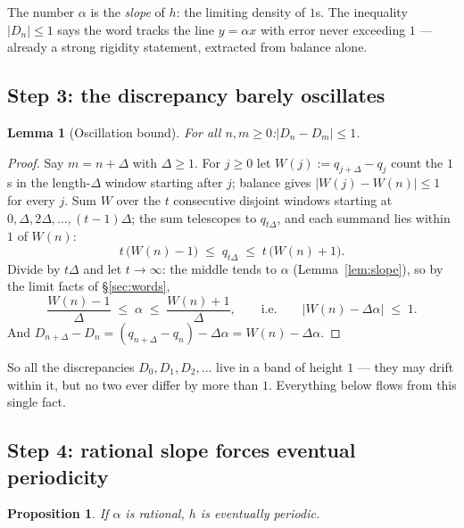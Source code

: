 \documentclass[11pt,reqno]{amsart}
\theoremstyle{plain}
\newtheorem{lemma}[theorem]{Lemma}
\newtheorem{proposition}[theorem]{Proposition}
\theoremstyle{definition}
\theoremstyle{remark}
\begin{document}
The number $\alpha$ is the \emph{slope} of $h$: the limiting density of $1$s. The
inequality $|D_n| \le 1$ says the word tracks the line $y = \alpha x$ with error
never exceeding $1$ --- already a strong rigidity statement, extracted from balance
alone.

\subsection{Step 3: the discrepancy barely oscillates}

\begin{lemma}[Oscillation bound]\label{lem:osc}
For all $n, m \ge 0$:\quad $|D_n - D_m| \le 1$.
\end{lemma}

\begin{proof}
Say $m = n + \Delta$ with $\Delta \ge 1$. For $j \ge 0$ let
$W(j) := q_{j + \Delta} - q_j$ count the $1$s in the length-$\Delta$ window starting
after $j$; balance gives $|W(j) - W(n)| \le 1$ for every $j$. Sum $W$ over the $t$
consecutive disjoint windows starting at $0, \Delta, 2\Delta, \dots, (t-1)\Delta$;
the sum telescopes to $q_{t\Delta}$, and each summand lies within $1$ of $W(n)$:
\[
  t\,\big(W(n) - 1\big) \;\le\; q_{t\Delta} \;\le\; t\,\big(W(n) + 1\big) .
\]
Divide by $t\Delta$ and let $t \to \infty$: the middle tends to $\alpha$
(Lemma~\ref{lem:slope}), so by the limit facts of \S\ref{sec:words},
\[
  \frac{W(n) - 1}{\Delta} \;\le\; \alpha \;\le\; \frac{W(n) + 1}{\Delta} ,
  \qquad\text{i.e.}\qquad |W(n) - \Delta\alpha| \;\le\; 1 .
\]
And $D_{n+\Delta} - D_n = (q_{n+\Delta} - q_n) - \Delta\alpha = W(n) -
\Delta\alpha$.
\end{proof}

So all the discrepancies $D_0, D_1, D_2, \dots$ live in a band of height $1$ ---
they may drift within it, but no two ever differ by more than $1$. Everything below
flows from this single fact.

\subsection{Step 4: rational slope forces eventual periodicity}

\begin{proposition}\label{prop:rational-case}
If $\alpha$ is rational, $h$ is eventually periodic.
\end{proposition}
\end{document}
